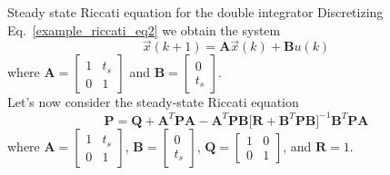 \documentclass[12pt,a4paper,oneside]{book}
\begin{document}
\begin{onehalfspace}
\begin{example}{Steady state Riccati equation for the double integrator}
Discretizing Eq.~\eqref{example_riccati_eq2} we obtain the system
\begin{equation}\label{riccati_init_3}
	\vec{x}(k+1)={\mathbf{A}}\vec{x}(k)+{\mathbf{B}}u(k)
\end{equation}
where $\mathbf{A}=\begin{bmatrix}1&t_s\\0&1\end{bmatrix}$ and $\mathbf{B}= 
\begin{bmatrix}0\\t_s\end{bmatrix}$. \\

Let's now consider the steady-state Riccati equation
\begin{equation}\label{example_riccati_eq3}
	\mathbf{P} =\mathbf{Q}+\mathbf{A}^T\mathbf{P}\mathbf{A} 
	-\mathbf{A}^T\mathbf{P}\mathbf{B}\Big[
	\mathbf{R}+\mathbf{B}^T\mathbf{P}\mathbf{B}\Big]^{-1} \mathbf{B}^T 	
	\mathbf{P}\mathbf{A} 
\end{equation}
where
$\mathbf{A}=\begin{bmatrix}1&t_s\\0&1\end{bmatrix}$, 
$\mathbf{B}=\begin{bmatrix}0\\t_s\end{bmatrix}$, $\mathbf{Q}=\begin{bmatrix}1&0\\0&1\end{bmatrix}$,
and $\mathbf{R}=1$. \\


\end{example}
\end{onehalfspace}
\end{document}
